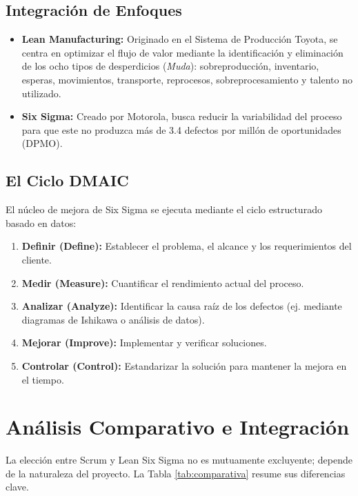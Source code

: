 \documentclass[12pt, a4paper]{article}
\begin{document}
\subsection{Integración de Enfoques}
\begin{itemize}[label=\textbullet]
    \item \textbf{Lean Manufacturing:} Originado en el Sistema de Producción Toyota, se centra en optimizar el flujo de valor mediante la identificación y eliminación de los ocho tipos de desperdicios (\textit{Muda}): sobreproducción, inventario, esperas, movimientos, transporte, reprocesos, sobreprocesamiento y talento no utilizado.
    \item \textbf{Six Sigma:} Creado por Motorola, busca reducir la variabilidad del proceso para que este no produzca más de 3.4 defectos por millón de oportunidades (DPMO).
\end{itemize}

\subsection{El Ciclo DMAIC}
El núcleo de mejora de Six Sigma se ejecuta mediante el ciclo estructurado basado en datos:
\begin{enumerate}
    \item \textbf{Definir (Define):} Establecer el problema, el alcance y los requerimientos del cliente.
    \item \textbf{Medir (Measure):} Cuantificar el rendimiento actual del proceso.
    \item \textbf{Analizar (Analyze):} Identificar la causa raíz de los defectos (ej. mediante diagramas de Ishikawa o análisis de datos).
    \item \textbf{Mejorar (Improve):} Implementar y verificar soluciones.
    \item \textbf{Controlar (Control):} Estandarizar la solución para mantener la mejora en el tiempo.
\end{enumerate}

\section{Análisis Comparativo e Integración}
La elección entre Scrum y Lean Six Sigma no es mutuamente excluyente; depende de la naturaleza del proyecto. La Tabla \ref{tab:comparativa} resume sus diferencias clave.
\end{document}
